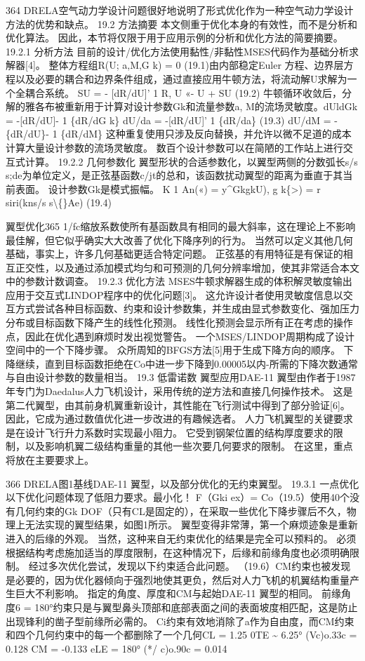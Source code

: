 \documentclass[UTF8,11pt,a4paper,openany,fontset=fandol]{ctexbook}
\begin{document}
364 DRELA空气动力学设计问题很好地说明了形式优化作为一种空气动力学设计方法的优势和缺点。 19.2 方法摘要 本文侧重于优化本身的有效性，而不是分析和优化算法。 因此，本节将仅限于用于应用示例的分析和优化方法的简要摘要。 19.2.1 分析方法 目前的设计/优化方法使用黏性/非黏性MSES代码作为基础分析求解器[4]。 整体方程组R(U; a,M,G k) = 0 (19.1)由内部稳定Euler 方程、边界层方程以及必要的耦合和边界条件组成，通过直接应用牛顿方法，将流动解U求解为一个全耦合系统。 SU = - [dR/dU]' 1 R, U «- U + SU (19.2) 牛顿循环收敛后，分解的雅各布被重新用于计算对设计参数Gk和流量参数a, M的流场灵敏度。dUldGk = -[dR/dU]- 1 \{dR/dG k\} dU/da = -[dR/dU]' 1 \{dR/da\} (19.3) dU/dM = -\{dR/dU\}- 1 \{dR/dM\} 这种重复使用只涉及反向替换，并允许以微不足道的成本计算大量设计参数的流场灵敏度。 数百个设计参数可以在简陋的工作站上进行交互式计算。 19.2.2 几何参数化 翼型形状的合适参数化，以翼型两侧的分数弧长s/s s;de为单位定义，是正弦基函数c/jt的总和，该函数扰动翼型的距离为垂直于其当前表面。 设计参数Gk是模式振幅。 K 1 An(«) = y\textasciicircum{}GkgkU), g k\{>) = r siri(kns/s s\textbackslash\{\}Ae) (19.4)

翼型优化365 1/fc缩放系数使所有基函数具有相同的最大斜率，这在理论上不影响最佳解，但它似乎确实大大改善了优化下降序列的行为。 当然可以定义其他几何基础，事实上，许多几何基础更适合特定问题。 正弦基的有用特征是有保证的相互正交性，以及通过添加模式均匀和可预测的几何分辨率增加，使其非常适合本文中的参数计数调查。 19.2.3 优化方法 MSES牛顿求解器生成的体积解灵敏度输出应用于交互式LINDOP程序中的优化问题[3]。 这允许设计者使用灵敏度信息以交互方式尝试各种目标函数、约束和设计参数集，并生成由显式参数变化、强加压力分布或目标函数下降产生的线性化预测。 线性化预测会显示所有正在考虑的操作点，因此在优化遇到麻烦时发出视觉警告。 一个MSES/LINDOP周期构成了设计空间中的一个下降步骤。 众所周知的BFGS方法[5]用于生成下降方向的顺序。 下降继续，直到目标函数拒绝在Co中进一步下降到0.00005以内-所需的下降次数通常与自由设计参数的数量相当。 19.3 低雷诺数 翼型应用DAE-11 翼型由作者于1987年专门为Daedalus人力飞机设计，采用传统的逆方法和直接几何操作技术。 这是第二代翼型，由其前身机翼重新设计，其性能在飞行测试中得到了部分验证[6]。 因此，它成为通过数值优化进一步改进的有趣候选者。 人力飞机翼型的关键要求是在设计飞行升力系数时实现最小阻力。 它受到钢架位置的结构厚度要求的限制，以及影响机翼二级结构重量的其他一些次要几何要求的限制。 在这里，重点将放在主要要求上。

366 DRELA图1基线DAE-11 翼型，以及部分优化的无约束翼型。 19.3.1 一点优化 以下优化问题体现了低阻力要求。最小化！ F（Gki ex）= Co（19.5）使用40个没有几何约束的Gk DOF（只有CL是固定的），在采取一些优化下降步骤后不久，物理上无法实现的翼型结果，如图1所示。 翼型变得非常薄，第一个麻烦迹象是重新进入的后缘的外观。 当然，这种来自无约束优化的结果是完全可以预料的。 必须根据结构考虑施加适当的厚度限制，在这种情况下，后缘和前缘角度也必须明确限制。 经过多次优化尝试，发现以下约束适合此问题。 （19.6）CM约束也被发现是必要的，因为优化器倾向于强烈地使其更负，然后对人力飞机的机翼结构重量产生巨大不利影响。 指定的角度、厚度和CM与起始DAE-11 翼型的相同。 前缘角度6 = 180°约束只是与翼型鼻头顶部和底部表面之间的表面坡度相匹配，这是防止出现锋利的凿子型前缘所必需的。 Ci约束有效地消除了a作为自由度，而CM约束和四个几何约束中的每一个都删除了一个几何CL = 1.25 0TE \textasciitilde{} 6.25° (Vc)o.33c = 0.128 CM = -0.133 eLE = 180° (*/ c)o.90c = 0.014
\end{document}

